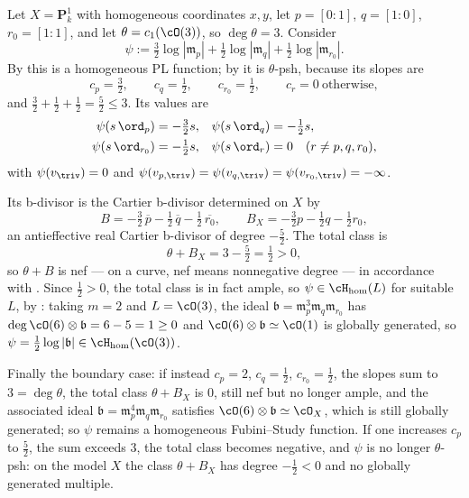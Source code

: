 \begin{example}
\label{ex:ch35-p1-bdivisor}
Let $X=\mathbf P^1_k$ with homogeneous coordinates $x,y$, let
$p=[0:1]$, $q=[1:0]$, $r_0=[1:1]$, and let
$\theta=c_1(\cO(3))$, so $\deg\theta=3$.  Consider
\begin{equation}
\label{eq:ch35-p1-example-psi}
 \psi:=\tfrac32\log|\mathfrak m_p|+\tfrac12\log|\mathfrak m_q|
 +\tfrac12\log|\mathfrak m_{r_0}| .
\end{equation}
By  this is a homogeneous PL function; by
 it is $\theta$-psh, because its
slopes are
\[
 c_p=\tfrac32,\qquad c_q=\tfrac12,\qquad c_{r_0}=\tfrac12,
 \qquad c_r=0\ \text{otherwise},
\]
and $\tfrac32+\tfrac12+\tfrac12=\tfrac52\leq3$.  Its values are
\[
 \begin{aligned}
 \psi(s\,\ord_p)&=-\tfrac32s,
 &\psi(s\,\ord_q)&=-\tfrac12s,\\
 \psi(s\,\ord_{r_0})&=-\tfrac12s,
 &\psi(s\,\ord_r)&=0\quad(r\neq p,q,r_0),
 \end{aligned}
\]
with $\psi(v_{\triv})=0$ and
$\psi(v_{p,\triv})=\psi(v_{q,\triv})=\psi(v_{r_0,\triv})=-\infty$.

Its b-divisor is the Cartier b-divisor determined on $X$ by
\begin{equation}
\label{eq:ch35-p1-example-B}
 B=-\tfrac32\,\overline p-\tfrac12\,\overline q
   -\tfrac12\,\overline{r_0},
 \qquad
 B_X=-\tfrac32p-\tfrac12q-\tfrac12r_0,
\end{equation}
an antieffective real Cartier b-divisor of degree $-\tfrac52$.  The total
class is
\[
 \theta+B_X=3-\tfrac52=\tfrac12>0,
\]
so $\theta+B$ is nef --- on a curve, nef means nonnegative degree ---
in accordance with .  Since
$\tfrac12>0$, the total class is in fact ample, so
$\psi\in\cH_{\mathrm{hom}}(L)$ for suitable $L$, by
: taking $m=2$ and
$L=\cO(3)$, the ideal $\mathfrak b=\mathfrak m_p^3\mathfrak m_q
\mathfrak m_{r_0}$ has $\deg\cO(6)\otimes\mathfrak b=6-5=1\geq0$ and
$\cO(6)\otimes\mathfrak b\simeq\cO(1)$ is globally generated, so
$\psi=\tfrac12\log|\mathfrak b|\in\cH_{\mathrm{hom}}(\cO(3))$.

Finally the boundary case: if instead $c_p=2$, $c_q=\tfrac12$,
$c_{r_0}=\tfrac12$, the slopes sum to $3=\deg\theta$, the total class
$\theta+B_X$ is $0$, still nef but no longer ample, and the associated
ideal $\mathfrak b=\mathfrak m_p^4\mathfrak m_q\mathfrak m_{r_0}$ satisfies
$\cO(6)\otimes\mathfrak b\simeq\cO_X$, which is still globally generated;
so $\psi$ remains a homogeneous Fubini--Study function.  If one increases
$c_p$ to $\tfrac52$, the sum exceeds $3$, the total class becomes
negative, and $\psi$ is no longer $\theta$-psh: on the model $X$ the
class $\theta+B_X$ has degree $-\tfrac12<0$ and no globally generated
multiple.
\end{example}

